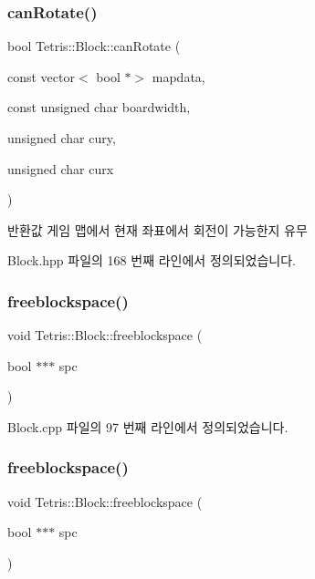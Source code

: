 \subsubsection{\texorpdfstring{can\+Rotate()}{canRotate()}\hspace{0.1cm}{\footnotesize\ttfamily [2/2]}}
{\footnotesize\ttfamily bool Tetris\+::\+Block\+::can\+Rotate (\begin{DoxyParamCaption}\item[{const vector$<$ bool $\ast$$>$}]{mapdata,  }\item[{const unsigned char}]{boardwidth,  }\item[{unsigned char}]{cury,  }\item[{unsigned char}]{curx }\end{DoxyParamCaption})\hspace{0.3cm}{\ttfamily [inline]}}

\begin{DoxyReturn}{반환값}
게임 맵에서 현재 좌표에서 회전이 가능한지 유무 
\end{DoxyReturn}


Block.\+hpp 파일의 168 번째 라인에서 정의되었습니다.

\mbox{\label{class_tetris_1_1_block_aea78e0a1b229842f541a8e897e2e9340}} 
\subsubsection{\texorpdfstring{freeblockspace()}{freeblockspace()}\hspace{0.1cm}{\footnotesize\ttfamily [1/2]}}
{\footnotesize\ttfamily void Tetris\+::\+Block\+::freeblockspace (\begin{DoxyParamCaption}\item[{bool $\ast$$\ast$$\ast$}]{spc }\end{DoxyParamCaption})}



Block.\+cpp 파일의 97 번째 라인에서 정의되었습니다.

\mbox{\label{class_tetris_1_1_block_aea78e0a1b229842f541a8e897e2e9340}} 
\subsubsection{\texorpdfstring{freeblockspace()}{freeblockspace()}\hspace{0.1cm}{\footnotesize\ttfamily [2/2]}}
{\footnotesize\ttfamily void Tetris\+::\+Block\+::freeblockspace (\begin{DoxyParamCaption}\item[{bool $\ast$$\ast$$\ast$}]{spc }\end{DoxyParamCaption})\hspace{0.3cm}{\ttfamily [inline]}}




